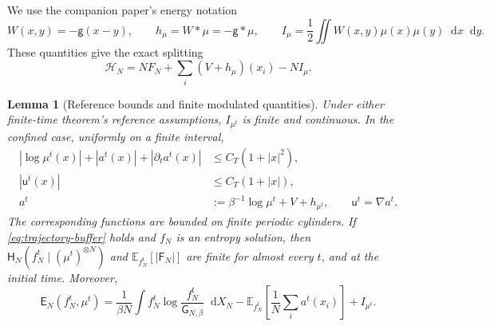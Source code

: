 \documentclass[11pt,reqno]{amsart}
\numberwithin{equation}{section}
\newtheorem{lemma}[lemma]{Lemma}
\theoremstyle{definition}
\theoremstyle{remark}
\newcommand{\E}{\mathbb E}
\newcommand{\g}{\mathsf g}
\newcommand{\HN}{\mathcal H_N}
\newcommand{\Hr}{\mathsf H}
\newcommand{\Fr}{\mathsf F}
\newcommand{\Er}{\mathsf E}
\newcommand{\G}{\mathsf G}
\renewcommand{\u}{\mathsf u}
\newcommand{\dd}{\mathop{}\!\mathrm d}
\begin{document}
We use the companion paper's energy notation
\begin{equation}\label{eq:h-I}
 W(x,y)=-\g(x-y),\qquad
 h_\mu=W*\mu=-\g*\mu,\qquad
 I_\mu=\frac12\iint W(x,y)\mu(x)\mu(y)\dd x\dd y.
\end{equation}
These quantities give the exact splitting
\begin{equation}\label{eq:exact-splitting}
 \HN=NF_N+\sum_i(V+h_\mu)(x_i)-NI_\mu.
\end{equation}

\begin{lemma}[Reference bounds and finite modulated quantities]\label{lem:domains}
Under either finite-time theorem's reference assumptions, $I_{\mu^t}$ is finite and continuous. In the confined case, uniformly on a finite interval,
\begin{align}
 |\log\mu^t(x)|+|a^t(x)|+|\partial_ta^t(x)|
 &\leq C_T(1+|x|^2),\label{eq:reference-quadratic}\\
 |\u^t(x)|&\leq C_T(1+|x|),\label{eq:reference-linear}\\
 a^t&:=\beta^{-1}\log\mu^t+V+h_{\mu^t},\qquad \u^t=\nabla a^t.
 \label{eq:chemical-potential}
\end{align}
The corresponding functions are bounded on finite periodic cylinders. If \eqref{eq:trajectory-buffer} holds and $f_N$ is an entropy solution, then $\Hr_N(f_N^t\mid(\mu^t)^{\otimes N})$ and $\E_{f_N^t}[|\Fr_N|]$ are finite for almost every $t$, and at the initial time. Moreover,
\begin{equation}\label{eq:energy-physical-identity}
 \Er_N(f_N^t,\mu^t)
 =\frac1{\beta N}\int f_N^t\log\frac{f_N^t}{\G_{N,\beta}}\dd X_N
       -\E_{f_N^t}\!\left[\frac1N\sum_i a^t(x_i)\right]+I_{\mu^t}.
\end{equation}
\end{lemma}
\end{document}
